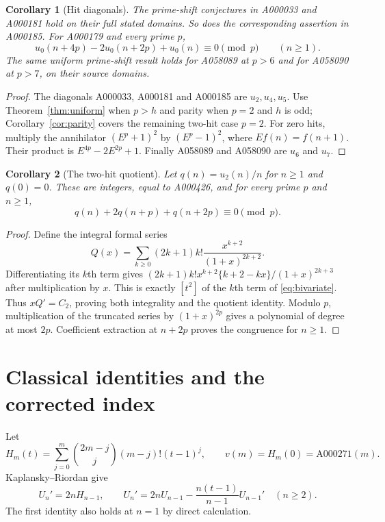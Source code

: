 \documentclass[11pt]{article}
\newtheorem{corollary}{Corollary}
\begin{document}
\begin{corollary}[Hit diagonals]\label{cor:diagonals}
The prime-shift conjectures in A000033 and A000181 hold on their full
stated domains. So does the corresponding assertion in A000185.
For A000179 and every prime $p$,
\[
 u_0(n+4p)-2u_0(n+2p)+u_0(n)\equiv0\pmod p\qquad(n\geq1).
\]
The same uniform prime-shift result holds for A058089 at $p>6$ and for
A058090 at $p>7$, on their source domains.
\end{corollary}
\begin{proof}
The diagonals A000033, A000181 and A000185 are $u_2,u_4,u_5$.
Use Theorem~\ref{thm:uniform} when $p>h$ and parity when $p=2$ and $h$ is odd;
Corollary~\ref{cor:parity} covers the remaining two-hit case $p=2$.
For zero hits, multiply the annihilator $(E^p+1)^2$ by $(E^p-1)^2$,
where $Ef(n)=f(n+1)$. Their product is $E^{4p}-2E^{2p}+1$.
Finally A058089 and A058090 are $u_6$ and $u_7$.
\end{proof}

\begin{corollary}[The two-hit quotient]\label{cor:quotient}
Let $q(n)=u_2(n)/n$ for $n\geq1$ and $q(0)=0$.
These are integers, equal to A000426, and for every prime $p$ and $n\geq1$,
\[
 q(n)+2q(n+p)+q(n+2p)\equiv0\pmod p.
\]
\end{corollary}
\begin{proof}
Define the integral formal series
\[
 Q(x)=\sum_{k\geq0}(2k+1)k!\frac{x^{k+2}}{(1+x)^{2k+2}}.
\]
Differentiating its $k$th term gives
$(2k+1)k!x^{k+2}\{k+2-kx\}/(1+x)^{2k+3}$ after multiplication by $x$.
This is exactly $[t^2]$ of the $k$th term of \eqref{eq:bivariate}.
Thus $xQ'=C_2$, proving both integrality and the quotient identity.
Modulo $p$, multiplication of the truncated series by $(1+x)^{2p}$
gives a polynomial of degree at most $2p$.
Coefficient extraction at $n+2p$ proves the congruence for $n\geq1$.
\end{proof}

\section{Classical identities and the corrected index}
Let
\[
 H_m(t)=\sum_{j=0}^m\binom{2m-j}{j}(m-j)!(t-1)^j,
 \qquad v(m)=H_m(0)=\mathrm{A000271}(m).
\]
Kaplansky--Riordan \cite[p.~122, equation (33)]{kr} give
\begin{equation}\label{eq:classical}
 U_n'=2nH_{n-1},\qquad
 U_n'=2nU_{n-1}-\frac{n(t-1)}{n-1}U_{n-1}'\quad(n\geq2).
\end{equation}
The first identity also holds at $n=1$ by direct calculation.
\end{document}
